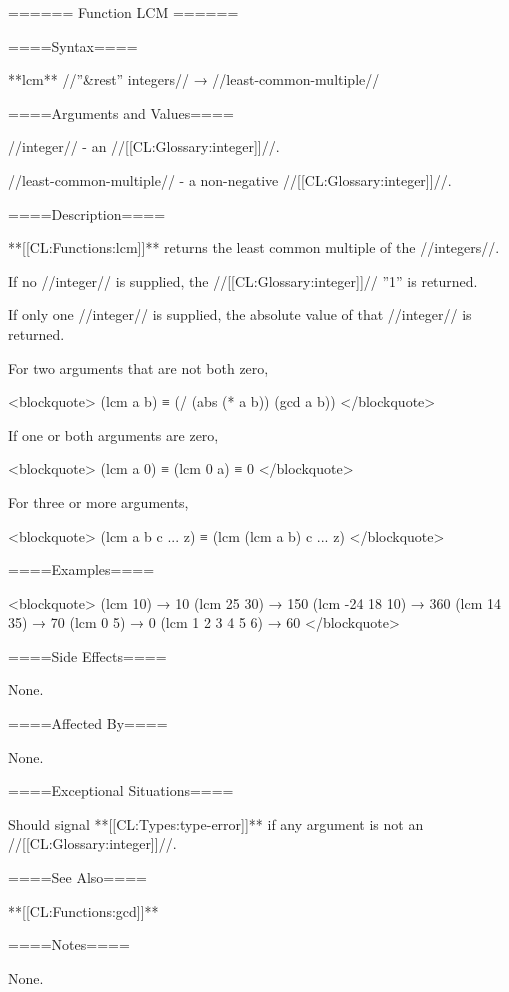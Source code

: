 ====== Function LCM ======

====Syntax====

**lcm** //''&rest'' integers// → //least-common-multiple//

====Arguments and Values====

//integer// - an //[[CL:Glossary:integer]]//.

//least-common-multiple// - a non-negative //[[CL:Glossary:integer]]//.

====Description====

**[[CL:Functions:lcm]]** returns the least common multiple of the //integers//.

If no //integer// is supplied, the //[[CL:Glossary:integer]]// ''1'' is returned.

If only one //integer// is supplied, the absolute value of that //integer// is returned.

For two arguments that are not both zero,

<blockquote> (lcm a b) ≡ (/ (abs (* a b)) (gcd a b)) </blockquote>

If one or both arguments are zero,

<blockquote> (lcm a 0) ≡ (lcm 0 a) ≡ 0 </blockquote>

For three or more arguments,

<blockquote> (lcm a b c ... z) ≡ (lcm (lcm a b) c ... z) </blockquote>

====Examples====

<blockquote> (lcm 10) → 10 (lcm 25 30) → 150 (lcm -24 18 10) → 360 (lcm 14 35) → 70 (lcm 0 5) → 0 (lcm 1 2 3 4 5 6) → 60 </blockquote>

====Side Effects====

None.

====Affected By====

None.

====Exceptional Situations====

Should signal **[[CL:Types:type-error]]** if any argument is not an //[[CL:Glossary:integer]]//.

====See Also====

**[[CL:Functions:gcd]]**

====Notes====

None.

